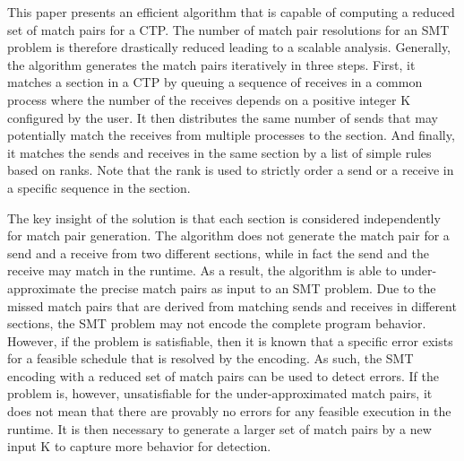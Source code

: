 This paper presents an efficient algorithm that is capable of computing a reduced set of match pairs for a CTP. The number of match pair resolutions for an SMT problem is therefore drastically reduced leading to a scalable analysis. Generally, the algorithm generates the match pairs iteratively in three steps. First, it matches a section in a CTP by queuing a sequence of receives in a common process where the number of the receives depends on a positive integer K configured by the user. It then distributes the same number of sends that may potentially match the receives from multiple processes to the section. And finally, it matches the sends and receives in the same section by a list of simple rules based on ranks. Note that the rank is used to strictly order a send or a receive in a specific sequence in the section.

The key insight of the solution is that each section is considered independently for match pair generation.  
The algorithm does not generate the match pair for a send and a receive from two different sections, while in fact the send and the receive may match in the runtime. 
As a result, the algorithm is able to under-approximate the precise match pairs as input to an SMT problem. 
Due to the missed match pairs that are derived from matching sends and receives in different sections, the SMT problem may not encode the complete program behavior. However, if the problem is satisfiable, then it is known that a specific error exists for a feasible schedule that is resolved by the encoding. As such, the SMT encoding with a reduced set of match pairs can be used to detect errors. If the problem is, however, unsatisfiable for the under-approximated match pairs, it does not mean that there are provably no errors for any feasible execution in the runtime. It is then necessary to generate a larger set of match pairs by a new input K to capture more behavior for detection.


